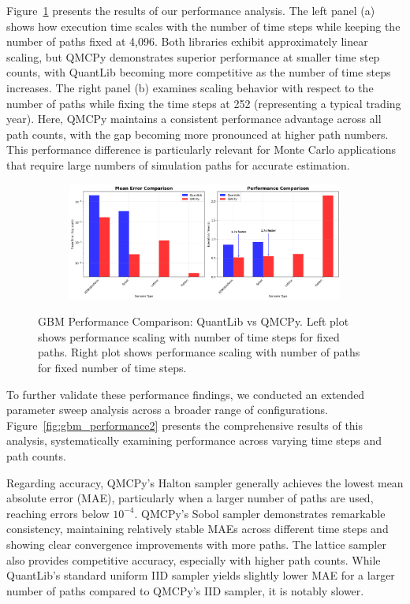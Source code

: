 Figure~\ref{fig:gbm_performance} presents the results of our performance
analysis. The left panel (a) shows how execution time scales with the number of
time steps while keeping the number of paths fixed at 4,096. Both libraries
exhibit approximately linear scaling, but QMCPy demonstrates superior
performance at smaller time step counts, with QuantLib becoming more competitive
as the number of time steps increases. The right panel (b) examines scaling
behavior with respect to the number of paths while fixing the time steps at 252
(representing a typical trading year). Here, QMCPy maintains a consistent
performance advantage across all path counts, with the gap becoming more
pronounced at higher path numbers. This performance difference is particularly
relevant for Monte Carlo applications that require large numbers of simulation
paths for accurate estimation.

\begin{figure}[H]
    \centering
    \begin{subfigure}{1\textwidth}
        \centering
        \includegraphics[width=\textwidth]{GBM/images/figure_6.png}
    \end{subfigure}
    \caption{GBM Performance Comparison: QuantLib vs QMCPy. Left plot shows performance scaling with number of time steps for fixed paths. Right plot shows performance scaling with number of paths for fixed number of time steps.}
    \label{fig:gbm_performance}
\end{figure}

To further validate these performance findings, we conducted an extended
parameter sweep analysis across a broader range of configurations.
Figure~\ref{fig:gbm_performance2} presents the comprehensive results of this
analysis, systematically examining performance across varying time steps and
path counts. 

Regarding accuracy, QMCPy's Halton sampler generally achieves the lowest mean
absolute error (MAE), particularly when a larger number of paths are used,
reaching errors below $10^{-4}$. QMCPy's Sobol sampler demonstrates remarkable
consistency, maintaining relatively stable MAEs across different time steps and
showing clear convergence improvements with more paths. The lattice sampler also
provides competitive accuracy, especially with higher path counts. While
QuantLib's standard uniform IID sampler yields slightly lower MAE for a larger
number of paths compared to QMCPy's IID sampler, it is notably slower.

